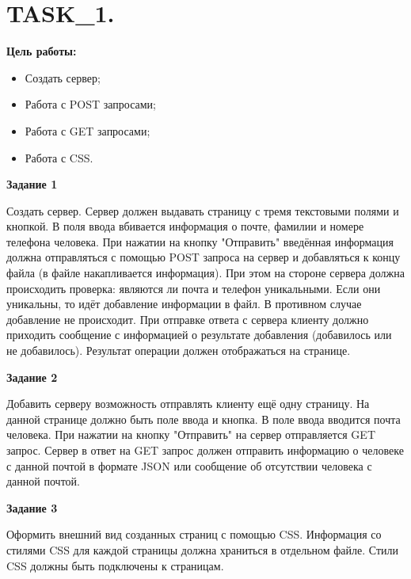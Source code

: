 \chapter{TASK\_1.}

\textbf{Цель работы:}

\begin{itemize} 
	\item Создать сервер;
	\item Работа с POST запросами;
	\item Работа с GET запросами;
	\item Работа с CSS.
\end{itemize}

\textbf{Задание 1}

Создать сервер. Сервер должен выдавать страницу с тремя текстовыми полями и кнопкой. В поля ввода вбивается информация о почте, фамилии и номере телефона человека. При нажатии на кнопку "Отправить" введённая информация должна отправляться с помощью POST запроса на сервер и добавляться к концу файла (в файле накапливается информация). При этом на стороне сервера должна происходить проверка: являются ли почта и телефон уникальными. Если они уникальны, то идёт добавление информации в файл. В противном случае добавление не происходит. При отправке ответа с сервера клиенту должно приходить сообщение с информацией о результате добавления (добавилось или не добавилось). Результат операции должен отображаться на странице.

\textbf{Задание 2}

Добавить серверу возможность отправлять клиенту ещё одну страницу. На данной странице должно быть поле ввода и кнопка. В поле ввода вводится почта человека. При нажатии на кнопку "Отправить" на сервер отправляется GET запрос. Сервер в ответ на GET запрос должен отправить информацию о человеке с данной почтой в формате JSON или сообщение об отсутствии человека с данной почтой.

\textbf{Задание 3}

Оформить внешний вид созданных страниц с помощью CSS. Информация со стилями CSS для каждой страницы должна храниться в отдельном файле. Стили CSS должны быть подключены к страницам.

\begin{lstlisting}[caption=Код программы. TASK\_1. Главнвая функция main]
	
\end{lstlisting}

\begin{lstlisting}[caption=Код программы. TASK\_1. Реализация заданий]
	
\end{lstlisting}


